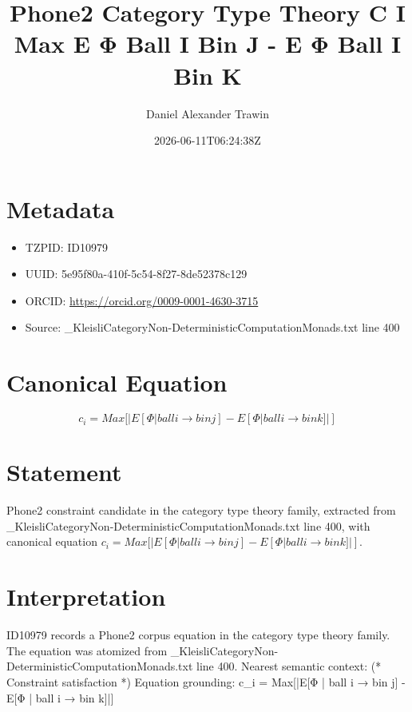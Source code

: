 \documentclass[11pt]{article}
\title{Phone2 Category Type Theory C I Max E Φ Ball I Bin J - E Φ Ball I Bin K}
\author{Daniel Alexander Trawin}
\date{2026-06-11T06:24:38Z}
\begin{document}
\maketitle
\section*{Metadata}
\begin{itemize}
\item TZPID: ID10979
\item UUID: 5e95f80a-410f-5c54-8f27-8de52378c129
\item ORCID: \url{https://orcid.org/0009-0001-4630-3715}
\item Source: _KleisliCategoryNon-DeterministicComputationMonads.txt line 400
\end{itemize}
\section*{Canonical Equation}
\[
c_i = Max[|E[Φ | ball i → bin j] - E[Φ | ball i → bin k]|]
\]
\section*{Statement}
Phone2 constraint candidate in the category type theory family, extracted from _KleisliCategoryNon-DeterministicComputationMonads.txt line 400, with canonical equation $c_i = Max[|E[Φ | ball i → bin j] - E[Φ | ball i → bin k]|]$.
\section*{Interpretation}
ID10979 records a Phone2 corpus equation in the category type theory family. The equation was atomized from _KleisliCategoryNon-DeterministicComputationMonads.txt line 400. Nearest semantic context: (* Constraint satisfaction *) Equation grounding: c_i = Max[|E[Φ | ball i → bin j] - E[Φ | ball i → bin k]|]
\end{document}
